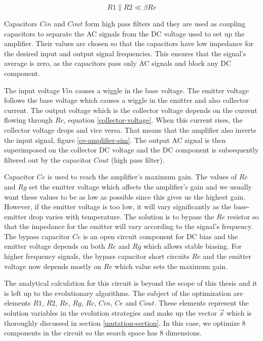 \begin{equation} \label{divider-impedance}
    R1 \| R2 \ll \beta Re
\end{equation}

Capacitors $Cin$ and $Cout$ form high pass filters and they are used as coupling capacitors to separate the AC signals from the DC voltage used to set up the amplifier. Their values are chosen so that the capacitors have low impedance for the desired input and output signal frequencies. This ensures that the signal's average is zero, as the capacitors pass only AC signals and block any DC component.

The input voltage $Vin$ causes a wiggle in the base voltage. The emitter voltage follows the base voltage which causes a wiggle in the emitter and also collector current. The output voltage which is the collector voltage depends on the current flowing through $Rc$, equation \ref{collector-voltage}. When this current rises, the collector voltage drops and vice versa. That means that the amplifier also inverts the input signal, figure \ref{ce-amplifier-sim}. The output AC signal is then superimposed on the collector DC voltage and the DC component is subsequently filtered out by the capacitor $Cout$ (high pass filter).

Capacitor $Ce$ is used to reach the amplifier's maximum gain. The values of $Re$ and $Rg$ set the emitter voltage which affects the amplifier's gain and we usually want these values to be as low as possible since this gives us the highest gain. However, if the emitter voltage is too low, it will vary significantly as the base-emitter drop varies with temperature. The solution is to bypass the $Re$ resistor so that the impedance for the emitter will vary according to the signal's frequency. The bypass capacitor $Ce$ is an open circuit component for DC bias and the emitter voltage depends on both $Re$ and $Rg$ which allows stable biasing. For higher frequency signals, the bypass capacitor short circuits $Re$ and the emitter voltage now depends mostly on $Re$ which value sets the maximum gain.

The analytical calculation for this circuit is beyond the scope of this thesis and it is left up to the evolutionary algorithms. The subject of the optimization are elements $R1$, $R2$, $Re$, $Rg$, $Rc$, $Cin$, $Ce$ and $Cout$. These elements represent the solution variables in the evolution strategies and make up the vector $\vec{x}$ which is thoroughly discussed in section \ref{mutation-section}. In this case, we optimize 8 components in the circuit so the search space has 8 dimensions.

